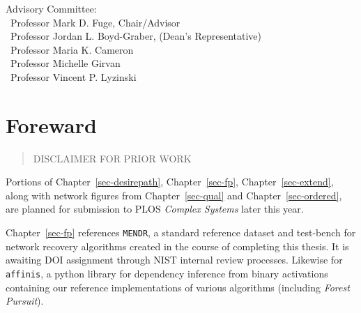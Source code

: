 \documentclass[%
	12pt,
		oneside,
		letterpaper
]{book}
\begin{document}
\vspace{7.5em}

\noindent Advisory Committee: \\
\hbox{\ }\hspace{.5in}Professor Mark D. Fuge, Chair/Advisor \\
\hbox{\ }\hspace{.5in}Professor Jordan L. Boyd-Graber, (Dean's Representative) \\
\hbox{\ }\hspace{.5in}Professor Maria K. Cameron \\
\hbox{\ }\hspace{.5in}Professor Michelle Girvan \\
\hbox{\ }\hspace{.5in}Professor Vincent P. Lyzinski \\
 \doublespacing


% 

% 
{}




\chapter*{Foreward}\label{foreward}


\setcounter{page}{2}

\begin{quote}
DISCLAIMER FOR PRIOR WORK
\end{quote}

Portions of Chapter~\ref{sec-desirepath}, Chapter~\ref{sec-fp}, Chapter~\ref{sec-extend}, along with network figures from Chapter~\ref{sec-qual} and Chapter~\ref{sec-ordered}, are planned for submission to PLOS \emph{Complex Systems} later this year.

Chapter~\ref{sec-fp} references \texttt{MENDR}, a standard reference dataset and test-bench for network recovery algorithms created in the course of completing this thesis.
It is awaiting DOI assignment through NIST internal review processes.
Likewise for \texttt{affinis}, a python library for dependency inference from binary activations containing our reference implementations of various algorithms (including \emph{Forest Pursuit}).
\end{document}
